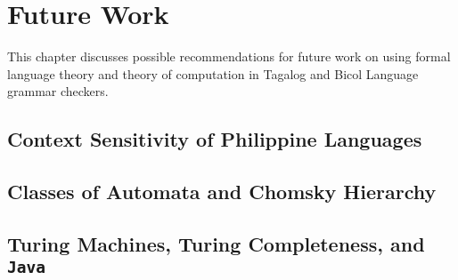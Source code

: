 \chapter{Future Work}
\label{future_work}

This chapter discusses possible recommendations for future work on using formal language theory and theory of computation in Tagalog and Bicol Language grammar checkers.

\section{Context Sensitivity of Philippine Languages}

\section{Classes of Automata and Chomsky Hierarchy}

\section{Turing Machines, Turing Completeness, and \texttt{Java}}